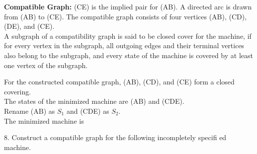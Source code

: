 \documentclass[12pt,a4paper]{book}
\begin{document}
\textbf{Compatible Graph:}  (CE) is the implied pair for (AB). A
directed arc is drawn from (AB) to (CE). The compatible
graph consists of four vertices (AB), (CD), (DE), and (CE).\\
A subgraph of a compatibility graph is said to be closed
cover for the machine, if for every vertex in the subgraph, all
outgoing edges and their terminal vertices also belong to the
subgraph, and every state of the machine is covered by at least
one vertex of the subgraph.\\
\begin{center}
 \end{center}
 For the constructed compatible graph, (AB), (CD), and
(CE) form a closed covering.\\ The states of the minimized machine are (AB) and (CDE).\\ Rename
(AB) as $S_1$ and (CDE) as $S_2$.\\
The minimized machine is
 \begin{center}
\begin{table}[h]
\centering
{}
\end{table}
\end{center} \newpage
$8.$ Construct a compatible graph for the following incompletely specifi ed machine.
\begin{center}
\begin{table}[h]
\centering
{}
\end{table}
\end{center}
\end{document}
